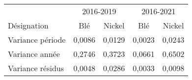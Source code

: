 \begin{tabular}{@{}lcccc@{}}
\toprule
    & \multicolumn{2}{c}{2016-2019}   & \multicolumn{2}{c}{2016-2021} \\
    Désignation  &  Blé &  Nickel& Blé &  Nickel \\ 
\cmidrule(r){1-1}\cmidrule(lr){2-3}\cmidrule(l){4-5}
    Variance période                         & 0,0086      &   0,0129    & 0,0023       & 0,0243      \\
    Variance année                           & 0,2746      &   0,3723    & 0,0661       & 0,6502      \\
    Variance résidus                         & 0,0048      &   0,0286    & 0,0033       & 0,0098      \\ 
\bottomrule
\end{tabular}